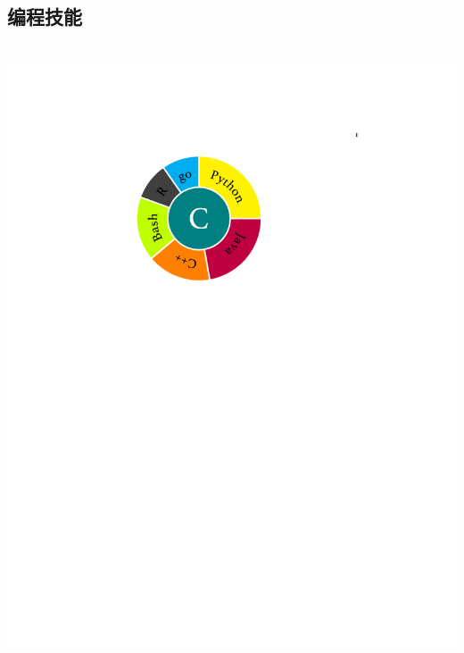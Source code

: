 \documentclass[]{friggeri-cv}
\begin{document}
\begin{aside}
  \section{\cuti 编程技能}
    ~
    \includegraphics[scale=0.62]{img/programming.pdf}
    ~

\end{aside}
\end{document}
